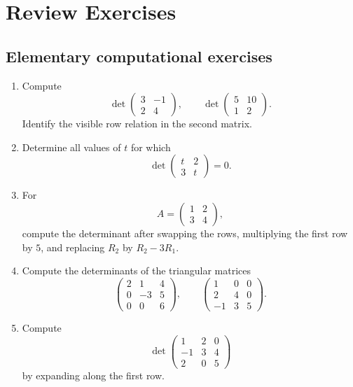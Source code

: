 \section{Review Exercises}

\subsection{Elementary computational exercises}

\begin{enumerate}
\item Compute
\[
\det\begin{pmatrix}3&-1\\2&4\end{pmatrix},
\qquad
\det\begin{pmatrix}5&10\\1&2\end{pmatrix}.
\]
Identify the visible row relation in the second matrix.

\item Determine all values of $t$ for which
\[
\det\begin{pmatrix}t&2\\3&t\end{pmatrix}=0.
\]

\item For
\[
A=\begin{pmatrix}1&2\\3&4\end{pmatrix},
\]
compute the determinant after swapping the rows, multiplying the first row by $5$, and replacing $R_2$ by $R_2-3R_1$.

\item Compute the determinants of the triangular matrices
\[
\begin{pmatrix}2&1&4\\0&-3&5\\0&0&6\end{pmatrix},
\qquad
\begin{pmatrix}1&0&0\\2&4&0\\-1&3&5\end{pmatrix}.
\]

\item Compute
\[
\det\begin{pmatrix}1&2&0\\-1&3&4\\2&0&5\end{pmatrix}
\]
by expanding along the first row.


\end{enumerate}
